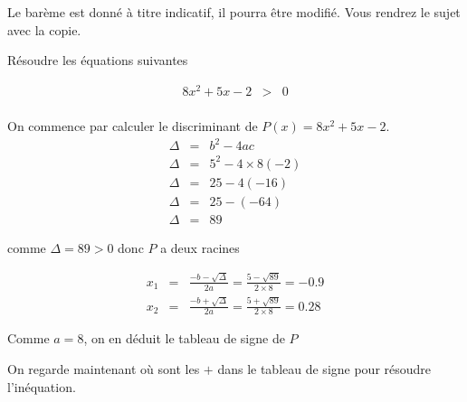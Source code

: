 \documentclass[a4paper,10pt, table]{/media/documents/Cours/Prof/Enseignements/tools/style/classDS}
\date{02 mars 2015}
\begin{document}
\maketitle

Le barème est donné à titre indicatif, il pourra être modifié. Vous rendrez le sujet avec la copie.

\begin{questions}

    \question
    Résoudre les équations suivantes
    
    
    \begin{eqnarray*}
        8 x^{  2 } + 5 x - 2 & > &0 \\
    \end{eqnarray*}

    \begin{solution}
        On commence par calculer le discriminant de $P(x) = 8 x^{  2 } + 5 x - 2$.
        \begin{eqnarray*}
            \Delta & = & b^2-4ac \\
            \Delta & = & 5^{  2 } - 4 \times 8 ( -2 ) \\ 
\Delta & = & 25 - 4 ( -16 ) \\ 
\Delta & = & 25 - ( -64 ) \\ 
\Delta & = & 89
        \end{eqnarray*}

        
        comme $\Delta = 89 > 0$ donc $P$ a deux racines

            \begin{eqnarray*}
                x_1 & = & \frac{-b - \sqrt{\Delta}}{2a} =  \frac{5 - \sqrt{89}}{2 \times 8} = -0.9 \\
                x_2 & = & \frac{-b + \sqrt{\Delta}}{2a} =  \frac{5 + \sqrt{89}}{2 \times 8} = 0.28
            \end{eqnarray*}


        
        Comme $a = 8$, on en déduit le tableau de signe de $P$
            \begin{center}
            \end{center}
        On regarde maintenant où sont les $+$ dans le tableau de signe pour résoudre l'inéquation.
        \end{solution}


\end{questions}
\end{document}
